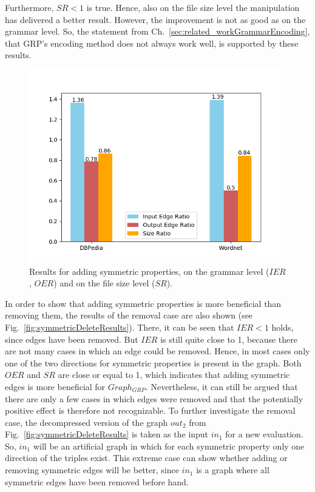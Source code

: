Furthermore, $SR<1$ is true. Hence, also on the file size level the manipulation has delivered a better result. However, the improvement is not as good as on the grammar level. So, the statement from Ch.~\ref{sec:related_workGrammarEncoding}, that GRP's encoding method does not always work well, is supported by these results. 



\begin{figure}
	\centering
	\includegraphics[width=0.8\linewidth]{figures/4_evaluation/ontology/ratiosSymmetricsAdd}
	\caption{Results for adding symmetric properties, on the grammar level ($IER$, $OER$) and on the file size level ($SR$).}
	\label{fig:symmetricAddResults}
\end{figure}


In order to show that adding symmetric properties is more beneficial than removing them, the results of the removal case are also shown (see Fig.~\ref{fig:symmetricDeleteResults}). There, it can be seen that $IER<1$ holds, since edges have been removed. But $IER$ is still quite close to 1, because there are not many cases in which an edge could be removed. Hence, in most cases only one of the two directions for symmetric properties is present in the graph. Both $OER$ and $SR$ are close or equal to 1, which indicates that adding symmetric edges is more beneficial for $Graph_{GRP}$. Nevertheless, it can still be argued that there are only a few cases in which edges were removed and that the potentially positive effect is therefore not recognizable. To further investigate the removal case, the decompressed version of the graph $out_2$ from Fig.~\ref{fig:symmetricDeleteResults} is taken as the input $in_1$ for a new evaluation. So, $in_1$ will be an artificial graph in which for each symmetric property only one direction of the triples exist. This extreme case can show whether adding or removing symmetric edges will be better, since $in_1$ is a graph where all symmetric edges have been removed before hand.

